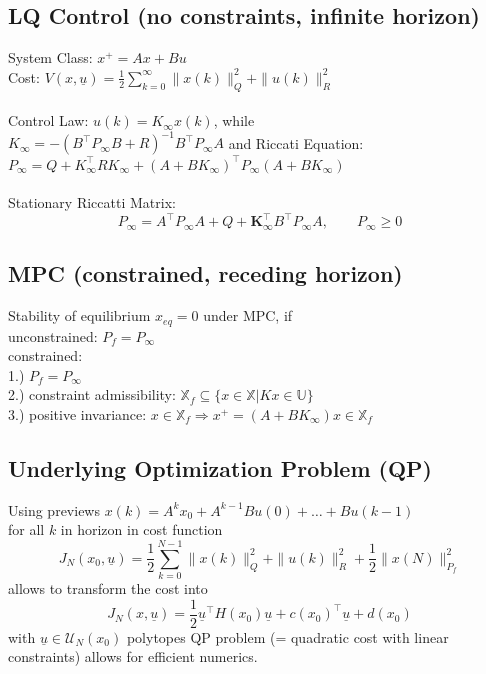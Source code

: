 \documentclass[english]{latex4ei/latex4ei_sheet}
\begin{document}
\begin{sectionbox}
\subsection{LQ Control (no constraints, infinite horizon)}
System Class: $x^{+}=A x+B u$ \\
Cost: $V(x, \underline{u})=\frac{1}{2} \sum\limits_{k=0}^{\infty}\|x(k)\|_{Q}^{2}+\|u(k)\|_{R}^{2}$ \\
\\
Control Law: $u(k)=K_{\infty} x(k)$, while \\ $K_{\infty}=-\left(B^{\top} P_{\infty} B+R\right)^{-1} B^{\top} P_{\infty} A$ and Riccati Equation:\\ 
${P_{\infty}=Q+K_{\infty}^{\top} R K_{\infty}+\left(A+B K_{\infty}\right)^{\top} P_{\infty}\left(A+B K_{\infty}\right)}$\\
\\
Stationary Riccatti Matrix:
$$P_{\infty}=A^{\top} P_{\infty} A+Q+\boldsymbol{K}_{\infty}^{\top}B^{\top} P_{\infty}A,\qquad P_{\infty}\geq 0$$

\subsection{MPC (constrained, receding horizon)}
Stability of equilibrium $x_{eq}=0$ under MPC, if\\
unconstrained: $P_{f}=P_{\infty}$\\
constrained:\\
1.) $P_{f}=P_{\infty}$ \\
2.) constraint admissibility: $\mathbb{X}_{f} \subseteq\{x \in \mathbb{X} | K x \in \mathbb{U}\}$ \\
3.) positive invariance: $x \in \mathbb{X}_{f} \Rightarrow x^{+}=\left(A+B K_{\infty}\right) x \in \mathbb{X}_{f}$\\

\subsection{Underlying Optimization Problem (QP)}
Using previews $x(k)=A^{k}x_{0}+A^{k-1}Bu(0)+\ldots+Bu(k-1)$\\
for all $k$ in horizon in cost function 
$$J_{N}\left(x_{0}, \underline{u}\right)=\frac{1}{2} \sum\limits_{k=0}^{N-1}\|x(k)\|_{Q}^{2}+\|u(k)\|_{R}^{2}+\frac{1}{2}\|x(N)\|_{P_{f}}^{2}$$
allows to transform the cost into $$J_N(x,\underline{u})=\frac{1}{2}\underline{u}^{\top}H(x_0)\underline{u}+c(x_{0})^{\top}\underline{u}+d(x_{0})$$
with $\underline{u}\in\mathcal{U}_{N}(x_{0})$
polytopes QP problem (= quadratic cost with linear constraints) allows for efficient numerics.

\end{sectionbox}
\end{document}
